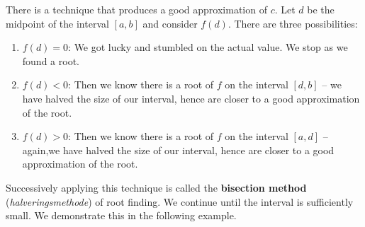 There is a technique that produces a good approximation of $c$. Let $d$ be the midpoint of the interval $[a,b]$ and consider $f(d)$. There are three possibilities:
	\begin{enumerate} 
	\item		$f(d) = 0$: We got lucky and stumbled on the actual value. We stop as we found a root.
	\item		$f(d) <0$: Then we know there is a root of $f$ on the interval $[d,b]$ -- we have halved the size of our interval, hence are closer to a good approximation of the root.
	\item		$f(d) >0$: Then we know there is a root of $f$ on the interval $[a,d]$ -- again,we have halved the size of our interval, hence are closer to a good approximation of the root.
	\end{enumerate}

Successively applying this technique is called the \textbf{bisection method} (\textit{halveringsmethode}) of root finding. We continue until the interval is sufficiently small. We demonstrate this in the following example.

